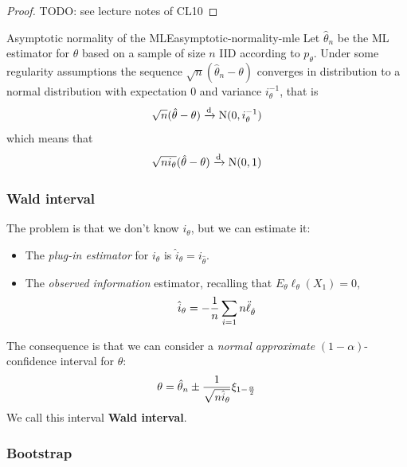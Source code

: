 \documentclass[12pt]{extarticle}
\newcommand{\Normal}{{\operatorfont N}}
\newcommand{\convdist}{\xrightarrow{\operatorfont d}}
\begin{document}
\begin{proof}
    TODO: see lecture notes of CL10
\end{proof}

\begin{theorem}{Asymptotic normality of the MLE}{asymptotic-normality-mle}
    Let $\hat \theta_n$ be the ML estimator for $\theta$ based on a sample of size $n$ IID according to $p_\theta$.
    Under some regularity assumptions the sequence $\sqrt n (\hat \theta_n - \theta)$ converges in distribution to a normal distribution with expectation $0$ and variance $i_\theta^{-1}$, that is
    \begin{equation}
        \sqrt n (\hat \theta - \theta) \convdist \Normal(0, i_\theta^{-1})
    \end{equation}
    which means that
    \begin{equation}
        \sqrt{n i_\theta}(\hat \theta - \theta) \convdist \Normal(0, 1)
    \end{equation}
\end{theorem}

\subsubsection{Wald interval}

The problem is that we don't know $i_\theta$, but we can estimate it:
\begin{itemize}
    \item The \emph{plug-in estimator} for $i_\theta$ is $\hat i_\theta = i_{\hat \theta}$.
    \item The \emph{observed information} estimator, recalling that $E_\theta \ell_\theta (X_1) = 0$,
          \begin{equation}
              \hat i_\theta = -\frac{1}{n} \sum_{i = 1}{n} \ddot \ell_{\hat \theta}
          \end{equation}
\end{itemize}

The consequence is that we can consider a \emph{normal approximate} $(1-\alpha)$-confidence interval for $\theta$:
\begin{equation}
    \theta = \hat \theta_n \pm \frac{1}{\sqrt{n \hat i_\theta}} \xi_{1- \frac{\alpha}{2}}
\end{equation}
We call this interval \textbf{Wald interval}.

\subsubsection{Bootstrap}
\end{document}
